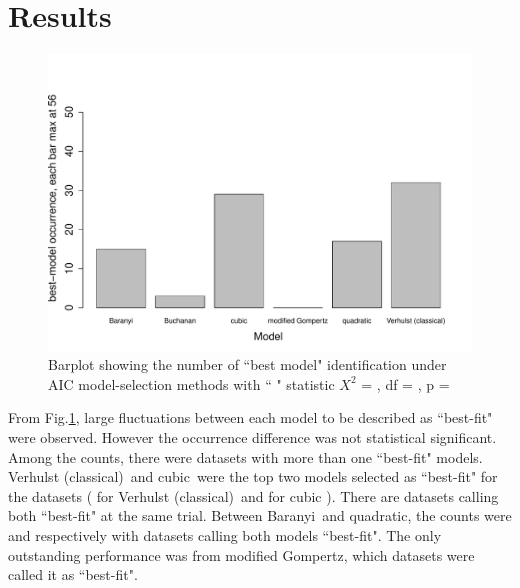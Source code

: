 \documentclass[a4paper, 11pt]{article}
\newcommand{\fve}{Verhulst (classical)}
\newcommand{\fgo}{modified Gompertz}
\newcommand{\fba}{Baranyi}
\newcommand{\fqu}{quadratic}
\newcommand{\fcu}{cubic}
\begin{document}
	\section*{Results}
	\begin{figure}[h]
		\centering
		\includegraphics[width=.8\linewidth]{../results/barplot_BestModel.pdf}
		\caption{Barplot showing the number of ``best model" identification under AIC model-selection methods with ``
			" statistic $X^{2}$ = 
			, df = 
			, p = 
		}\label{barPT}
	\end{figure}
	From Fig.\ref{barPT}, large fluctuations between each model to be described as ``best-fit" were observed.  However the occurrence difference was not statistical significant.  Among the counts, there were 
	datasets with more than one ``best-fit" models.  \fve\ and \fcu\ were the top two models selected as ``best-fit" for the 
	 datasets (
	  for \fve\ and 
	  for \fcu
	 ).  There are 
	  datasets calling both ``best-fit" at the same trial.  Between \fba\ and \fqu, the counts were 
	  and 
	  respectively with 
	 datasets calling both models ``best-fit".  The only outstanding performance was from \fgo, which 
	  datasets were called it as ``best-fit".\\
\end{document}
